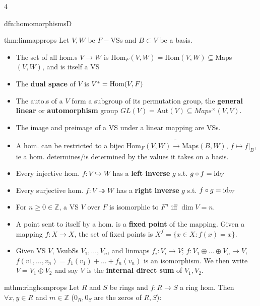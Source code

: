 \documentclass[landscape, 8pt]{extarticle}
\begin{document}
\begin{multicols*}{4}
\begin{mdfn}{dfn:homomorphisms}{D}
		\end{mdfn}
		
			
		\begin{mthm}{thm:linmapprops}{ }
			Let $V, W$ be $F-$VSs and $B \subset V$ be a basis.
		
			\begin{itemize}
				\item The set of all hom.s $V \to W$ is Hom$_F(V, W) =$Hom$(V, W) \subseteq$Maps$(V, W)$, and is itself a VS
				\item The \textbf{dual space} of $V$ is $V^* = \operatorname{Hom}(V, F)$
				\item The auto.s of a $V$ form a subgroup of its permutation group, the \textbf{general linear} or \textbf{automorphism} group $GL(V) =$Aut$(V) \subseteq Maps^\times(V, V).$
				\item The image and preimage of a VS under a linear mapping are VSs.
				\item A hom. can be restricted to a bijec Hom$_F(V, W) \tilde{\to}$Maps$(B, W)$, $f \mapsto \left.f\right|_B$, ie a hom. determines/is determined by the values it takes on a basis.
				\item Every injective hom. $f: V \hookrightarrow W$ has a \textbf{left inverse} $g$ s.t. $g \circ f =\operatorname{id}_V$
				\item Every surjective hom. $f: V \twoheadrightarrow W$ has a \textbf{right inverse} $g$ s.t. $f \circ g =\operatorname{id}_W$
				\item For $n \ge 0 \in \mathbb{Z}$, a VS $V$ over $F$ is isomorphic to $F^n$ iff $\dim V = n$.
				\item A point sent to itself by a hom. is a \textbf{fixed point} of the mapping. Given a mapping $f: X \to X$, the set of fixed points is $X^f = \{x \in X : f(x) = x\}$.
				\item Given VS $V$, VsubSs $V_1, \dots, V_n$, and linmaps $f_i: V_i \to V$; $f: V_1 \oplus \dots \oplus V_n \to V$, $f(v1, \dots, v_n) = f_1(v_1) + \dots + f_n(v_n)$ is an isomorphism. We then write $V = V_1 \oplus V_2$ and say $V$ is the \textbf{internal direct sum} of $V_1, V_2$.
			\end{itemize}
			
		\end{mthm}
			
			
			\begin{mthm}{mthm:ringhomprops}{ }
				Let $R$ and $S$ be rings and $f : R \to S$ a ring hom. Then $\forall x,y\in R$ and $m\in \mathbb{Z}$ ($0_{R}, 0_{S}$ are the zeros of $R, S$):
			

\end{mthm}
\end{multicols*}
\end{document}
